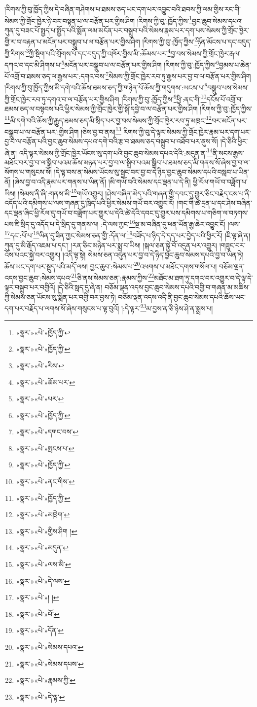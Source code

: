 །རིགས་ཀྱི་བུ་ཁྱོད་ཀྱིས་དེ་བཞིན་གཤེགས་པ་ཐམས་ཅད་ཡང་དག་པར་འབྱུང་བའི་ཐབས་ཀྱི་ལམ་གྱིས་རང་གི་སེམས་ཀྱི་གྲོང་ཁྱེར་ཉེ་བར་བསྟན་པ་ལ་བརྩོན་པར་གྱིས་ཤིག །རིགས་ཀྱི་བུ་:ཁྱོད་ཀྱིས་\footnote{«སྣར་»«པེ་»ཁྱོད་ཀྱི་}བྱང་ཆུབ་སེམས་དཔའ་ཀུན་དུ་བཟང་པོ་སྤྱད་པ་སྤྱོད་པའི་སྨོན་ལམ་མངོན་པར་བསྒྲུབ་པའི་སེམས་རྣམ་པར་དག་པས་སེམས་ཀྱི་གྲོང་ཁྱེར་གྱི་ར་བ་བརྟན་པ་མངོན་པར་བསྒྲུབ་པ་ལ་བརྩོན་པར་གྱིས་ཤིག །རིགས་ཀྱི་བུ་:ཁྱོད་ཀྱིས་\footnote{«སྣར་»«པེ་»ཁྱོད་ཀྱི་}ཉོན་མོངས་པ་དང་བདུད་ཀྱི་རིགས་\footnote{«སྣར་»«པེ་»རིས་}ཀྱི་སྡིག་པའི་གྲོགས་པོ་དང་བདུད་ཀྱི་འཁོར་གྱིས་མི་:ཆོམས་པར་\footnote{«སྣར་»«པེ་»ཆོམ་པར་}བྱ་བས་སེམས་ཀྱི་གྲོང་ཁྱེར་རྒལ་དཀའ་བ་དང་མི་ཤིགས་པ་\footnote{«སྣར་»«པེ་»པར་}མངོན་པར་བསྒྲུབ་པ་ལ་བརྩོན་པར་གྱིས་ཤིག །རིགས་ཀྱི་བུ་:ཁྱོད་ཀྱིས་\footnote{«སྣར་»«པེ་»ཁྱོད་ཀྱི་}བྱམས་པ་ཆེན་པོ་འགྲོ་བ་ཐམས་ཅད་ལ་རྒྱས་པར་:དགའ་བས་\footnote{«སྣར་»«པེ་»དགང་བས་}སེམས་ཀྱི་གྲོང་ཁྱེར་རབ་ཏུ་རྒྱས་པར་བྱ་བ་ལ་བརྩོན་པར་གྱིས་ཤིག །རིགས་ཀྱི་བུ་ཁྱོད་ཀྱིས་མི་དགེ་བའི་ཆོས་ཐམས་ཅད་ཀྱི་གཉེན་པོ་ཆོས་ཀྱི་གདུགས་:ཡངས་པ་\footnote{«སྣར་»«པེ་»སྤངས་པ་}བསྒྲུབ་པས་སེམས་ཀྱི་གྲོང་ཁྱེར་རབ་ཏུ་དགའ་བ་ལ་བརྩོན་པར་གྱིས་ཤིག །རིགས་ཀྱི་བུ་:ཁྱོད་ཀྱིས་\footnote{«སྣར་»«པེ་»ཁྱོད་ཀྱི་}ཕྱི་:ནང་གི་\footnote{«སྣར་»«པེ་»ནང་གིས་}དངོས་པོ་འགྲོ་བ་ཐམས་ཅད་ལ་བསྟབས་པའི་ཕྱིར་སེམས་ཀྱི་གྲོང་ཁྱེར་གྱི་སྒོ་དབྱེ་བ་ལ་བརྩོན་པར་གྱིས་ཤིག །རིགས་ཀྱི་བུ་:ཁྱོད་ཀྱིས་\footnote{«སྣར་»«པེ་»ཁྱོད་ཀྱི་}མི་དགེ་བའི་ཆོས་ཀྱི་རྒྱུད་ཐམས་ཅད་མི་སྲིད་པར་བྱ་བས་སེམས་ཀྱི་གྲོང་ཁྱེར་རབ་ཏུ་མཁྲང་\footnote{«སྣར་»«པེ་»མཁྲེག་}བར་མངོན་པར་བསྒྲུབ་པ་ལ་བརྩོན་པར་:གྱིས་ཤིག །ཅེས་བྱ་བ་ནས།\footnote{«སྣར་»«པེ་»གྱིས་ཤིག །} རིགས་ཀྱི་བུ་དེ་ལྟར་སེམས་ཀྱི་གྲོང་ཁྱེར་རྣམ་པར་དག་པར་བྱ་བ་ལ་བརྩོན་པའི་བྱང་ཆུབ་སེམས་དཔའ་དགེ་བའི་རྩ་བ་ཐམས་ཅད་བསྒྲུབ་པ་འཐོབ་པར་ནུས་སོ། །དེ་ཅིའི་ཕྱིར་ཞེ་ན། འདི་ལྟར་སེམས་ཀྱི་གྲོང་ཁྱེར་ཡོངས་སུ་དག་པའི་བྱང་ཆུབ་སེམས་དཔའ་དེའི་:མདུན་ན་\footnote{«སྣར་»«པེ་»མདུན་}ནི་སངས་རྒྱས་མཐོང་བར་བྱ་བ་ལ་སྒྲིབ་པའམ་ཆོས་མཉན་པར་བྱ་བ་ལ་སྒྲིབ་པའམ་སྒྲིབ་པ་ཐམས་ཅད་མི་གནས་སོ་ཞེས་བྱ་བ་ལ་སོགས་པ་གསུངས་སོ། །དེ་ལྟ་བས་ན་སེམས་ཡོངས་སུ་སྦྱང་བར་བྱ་བ་དེ་ཉིད་བྱང་ཆུབ་སེམས་དཔའི་བསླབ་པ་ཡིན་ནོ། །ཞེས་བྱ་བ་འདི་རྣམ་པར་གནས་པ་ཡིན་ནོ། །མི་གཡོ་བའི་སེམས་དང་ལྡན་པ་དེ་ནི། ཕྱི་རོལ་གཡོ་བ་བཟློག་པ་ཡིས། །སེམས་ནི་ཞི་:གནས་མི་\footnote{«སྣར་»«པེ་»ལས་མི་}གཡོ་འགྱུར། །ཤེས་བཞིན་མེད་པའི་གཞན་གྱི་དབང་དུ་གྱུར་ཅིང་བརྗེད་ངས་པ་ནི་འདོད་པའི་དམིགས་པ་ལས་གཞན་དུ་ཁྲིད་པའི་ཕྱིར་སེམས་གཡོ་བར་འགྱུར་རོ། །གང་གི་ཚེ་དྲན་པ་དང་ཤེས་བཞིན་དང་ལྡན་ཞིང་ཕྱི་རོལ་དུ་གཡོ་བ་བཟློག་པར་གྱུར་པ་དེའི་ཚེ་དེའི་དབང་དུ་གྱུར་པས་དམིགས་པ་གཅིག་ལ་བཏགས་པས་ཇི་སྲིད་དུ་འདོད་པ་དེ་སྲིད་དུ་གནས་ལ། :དེ་ལས་ཀྱང་\footnote{«སྣར་»«པེ་»དེ་ལས་}སྔ་མ་བཞིན་དུ་ཕན་ཡོན་རྒྱ་ཆེར་འབྱུང་ངོ། །ལས་\footnote{«སྣར་»«པེ་»། །}དང་:པོ་པ་\footnote{«སྣར་»«པེ་»པོ་}ཡིན་དུ་ཟིན་ཀྱང་སེམས་ཅན་གྱི་:དོན་ལ་\footnote{«སྣར་»«པེ་»དོན་}བཟོད་པ་ཉིད་དེ་དད་པར་བྱེད་པའི་ཕྱིར་རོ། །ཇི་ལྟ་ཞེ་ན། ཀུན་དུ་མི་རྒོད་འཇམ་པ་དང་། །རན་ཅིང་མཉེན་པར་སྨྲ་བ་ཡིས། །སྐལ་ཅན་སྐྱེ་བོ་འདུན་པར་འགྱུར། །གཟུང་བར་འོས་པའང་སྐྱེ་བར་འགྱུར། །འདི་ལྟ་སྟེ། སེམས་ཅན་འདུན་པར་བྱ་བ་དེ་ཉིད་བྱང་ཆུབ་སེམས་དཔའི་བྱ་བ་ཡིན་ཏེ། ཆོས་ཡང་དག་པར་སྡུད་པའི་མདོ་ལས། བྱང་ཆུབ་:སེམས་པ་\footnote{«སྣར་»«པེ་»སེམས་དཔའ་}འཕགས་པ་མཐོང་དགས་གསོལ་པ། བཅོམ་ལྡན་འདས་བྱང་ཆུབ་:སེམས་དཔའ་\footnote{«སྣར་»«པེ་»སེམས་དཔས་}ཅི་ནས་སེམས་ཅན་:རྣམས་ཀྱིས་\footnote{«སྣར་»«པེ་»རྣམས་ཀྱི་}མཐོང་མ་ཐག་ཏུ་དགའ་བར་འགྱུར་བ་དེ་ལྟ་དེ་ལྟར་བསྒྲུབ་པར་བགྱིའོ། །དེ་ཅིའི་སླད་དུ་ཞེ་ན། བཅོམ་ལྡན་འདས་བྱང་ཆུབ་སེམས་དཔའི་བགྱི་བ་གཞན་མ་མཆིས་ཀྱི་སེམས་ཅན་ཡོངས་སུ་སྨིན་པར་བགྱི་བར་བྱས་ཏེ། བཅོམ་ལྡན་འདས་འདི་ནི་བྱང་ཆུབ་སེམས་དཔའི་ཆོས་ཡང་དག་པར་བརྗོད་པ་ལགས་སོ་ཞེས་གསུངས་པ་ལྟ་བུའོ། །:དེ་ལྟར་\footnote{«སྣར་»«པེ་»དེ་ལྟ་}མ་བྱས་ན་ཅི་ཉེས་ཤེ་ན་སྨྲས་པ། 